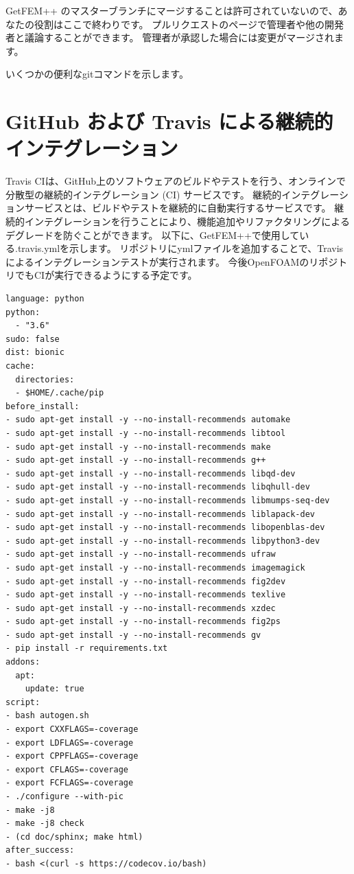 \documentclass{ltjoc}
\begin{document}
GetFEM++ のマスターブランチにマージすることは許可されていないので、あなたの役割はここで終わりです。
プルリクエストのページで管理者や他の開発者と議論することができます。
管理者が承認した場合には変更がマージされます。

いくつかの便利なgitコマンドを示します。

\begin{shbox}
\end{shbox}

\section{GitHub および Travis による継続的インテグレーション}
Travis CIは、GitHub上のソフトウェアのビルドやテストを行う、オンラインで分散型の継続的インテグレーション (CI) サービスです。
継続的インテグレーションサービスとは、ビルドやテストを継続的に自動実行するサービスです。
継続的インテグレーションを行うことにより、機能追加やリファクタリングによるデグレードを防ぐことができます。
以下に、GetFEM++で使用している.travis.ymlを示します。
リポジトリにymlファイルを追加することで、Travisによるインテグレーションテストが実行されます。
今後OpenFOAMのリポジトリでもCIが実行できるようにする予定です。
\begin{lstlisting}
language: python
python:
  - "3.6"
sudo: false
dist: bionic
cache:
  directories:
  - $HOME/.cache/pip
before_install:
- sudo apt-get install -y --no-install-recommends automake
- sudo apt-get install -y --no-install-recommends libtool
- sudo apt-get install -y --no-install-recommends make
- sudo apt-get install -y --no-install-recommends g++
- sudo apt-get install -y --no-install-recommends libqd-dev
- sudo apt-get install -y --no-install-recommends libqhull-dev
- sudo apt-get install -y --no-install-recommends libmumps-seq-dev
- sudo apt-get install -y --no-install-recommends liblapack-dev
- sudo apt-get install -y --no-install-recommends libopenblas-dev
- sudo apt-get install -y --no-install-recommends libpython3-dev
- sudo apt-get install -y --no-install-recommends ufraw
- sudo apt-get install -y --no-install-recommends imagemagick
- sudo apt-get install -y --no-install-recommends fig2dev
- sudo apt-get install -y --no-install-recommends texlive
- sudo apt-get install -y --no-install-recommends xzdec
- sudo apt-get install -y --no-install-recommends fig2ps
- sudo apt-get install -y --no-install-recommends gv
- pip install -r requirements.txt
addons:
  apt:
    update: true
script:
- bash autogen.sh
- export CXXFLAGS=-coverage
- export LDFLAGS=-coverage
- export CPPFLAGS=-coverage
- export CFLAGS=-coverage
- export FCFLAGS=-coverage
- ./configure --with-pic
- make -j8
- make -j8 check
- (cd doc/sphinx; make html)
after_success:
- bash <(curl -s https://codecov.io/bash)
\end{lstlisting}
\end{document}
